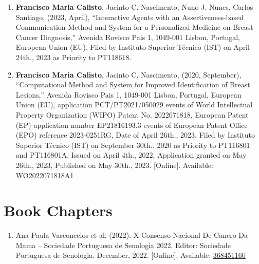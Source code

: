 \begin{enumerate}
\item {\bf Francisco Maria Calisto}, Jacinto C. Nascimento, Nuno J. Nunes, Carlos Santiago, (2023, April), ``Interactive Agents with an Assertiveness-based Communication Method and System for a Personalized Medicine on Breast Cancer Diagnosis,'' Avenida Rovisco Pais 1, 1049-001 Lisbon, Portugal, European Union (EU), Filed by Instituto Superior T\'{e}cnico (IST) on April 24th., 2023 as Priority to PT118618.
\item {\bf Francisco Maria Calisto}, Jacinto C. Nascimento, (2020, September), ``Computational Method and System for Improved Identification of Breast Lesions,'' Avenida Rovisco Pais 1, 1049-001 Lisbon, Portugal, European Union (EU), application PCT/PT2021/050029 events of World Intellectual Property Organization (WIPO) Patent No. 2022071818, European Patent (EP) application number EP21816193.3 events of European Patent Office (EPO) reference 2023-0251RG, Date of April 26th., 2023, Filed by Instituto Superior T\'{e}cnico (IST) on September 30th., 2020 as Priority to PT116801 and PT116801A, Issued on April 4th., 2022, Application granted on May 26th., 2023, Published on May 30th., 2023. [Online]. Available: \href{https://patents.google.com/patent/WO2022071818A1}{WO2022071818A1}
\end{enumerate}

\section*{Book Chapters}
\label{sec:chap00100604}

\begin{enumerate}
\item Ana Paula Vasconcelos et al. (2022). X Consenso Nacional De Cancro Da Mama -- Sociedade Portuguesa de Senologia 2022. Editor: Sociedade Portuguesa de Senologia. December, 2022. [Online]. Available: \href{https://www.researchgate.net/publication/368451160}{368451160}
\end{enumerate}
